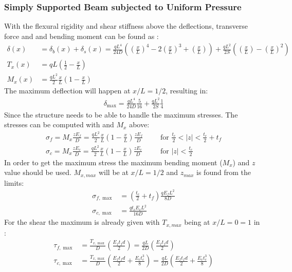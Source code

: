 \documentclass[10pt,a4paper,20pt]{article}
\begin{document}
\subsubsection{Simply Supported Beam subjected to Uniform Pressure}
With the flexural rigidity and shear stiffness above the deflections, transverse force and and bending moment can be found as \cite[p. 4.26 s. 4.9.5]{IntroSW}:
\begin{align}
\delta(x) &= \delta_b(x)+ \delta_s(x) = \frac{qL^4}{24 D}\left(\left(\frac{x}{L}\right)^4-2\left(\frac{x}{L}\right)^3+\left(\frac{x}{L}\right)\right) + \frac{qL^2}{2 S}\left(\left(\frac{x}{L}\right)-\left(\frac{x}{L}\right)^2\right)\\
T_x(x) &= qL\left(\frac{1}{2}-\frac{x}{L}\right)\\
M_x(x) &= \frac{qL^2}{2}\frac{x}{L}\left(1-\frac{x}{L}\right)
\end{align}  
The maximum deflection will happen at $x/L = 1/2$, resulting in:
\begin{align}
\delta_{\max} = \frac{qL^4}{24 D} \frac{5}{16} + \frac{qL^2}{2 S} \frac{1}{4}
\end{align}
Since the structure needs to be able to handle the maximum stresses. The stresses can be computed with \cite[p. 3.3 eq. 3.8]{IntroSW} and $M_x$ above:
\begin{align}
\sigma_f = M_x \frac{z E_f}{D} = \frac{qL^2}{2}\frac{x}{L}\left(1-\frac{x}{L}\right)\frac{z E_f}{D} && &\text{for } \frac{t_c}{2}<|z|<\frac{t_c}{2} + t_f \\
\sigma_c = M_x \frac{z E_c}{D} = \frac{qL^2}{2}\frac{x}{L}\left(1-\frac{x}{L}\right)\frac{z E_c}{D} && &\text{for } |z|<\frac{t_c}{2}
\end{align}
In order to get the maximum stress the maximum bending moment ($M_x$) and $z$ value should be used. $M_{x,max}$ will be at $x/L = 1/2$ and $z_{max}$ is found from the limits:
\begin{align}
\sigma_{f,\max} &= \left(\frac{t_c}{2}+t_f\right)\frac{q E_f L^2}{8 D}  \\
\sigma_{c,\max} &= \frac{q t_c E_cL^2}{16 D} 
\end{align}
For the shear the maximum is already given with $T_{x,max}$ being at $x/L=0=1$ in \cite[p. 3.4 eq. 3.14 and 3.15]{IntroSW}:
\begin{align}
\tau_{f,\max} &= \frac{T_{x,\max}}{D}\left(\frac{E_f t_f d}{2}\right) = \frac{q L}{2D}\left(\frac{E_f t_f d}{2}\right) \\
\tau_{c,\max} &= \frac{T_{x,\max}}{D}\left(\frac{E_f t_f d}{2}+\frac{E_ct_c^3}{8}\right) = \frac{q L}{2D}\left(\frac{E_f t_f d}{2}+\frac{E_ct_c^3}{8}\right)
\end{align}
\end{document}

